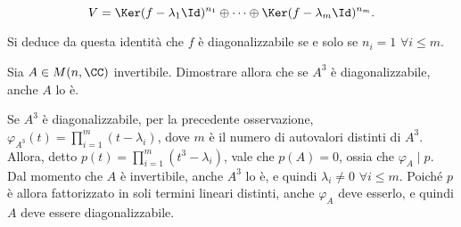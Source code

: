 \documentclass[11pt]{article}
\begin{document}
	\[ V = \Ker (f - \lambda_1 \Id)^{n_1} \oplus \cdots \oplus \Ker (f - \lambda_m \Id)^{n_m}. \]
	
	Si deduce da questa identità che $f$ è diagonalizzabile se e solo se $n_i = 1$ $\forall i \leq m$.
	
	\begin{exercise}
		Sia $A \in M(n, \CC)$ invertibile. Dimostrare allora che se $A^3$ è diagonalizzabile, anche $A$ lo è. 
	\end{exercise}

	\begin{solution}
		Se $A^3$ è diagonalizzabile, per la precedente osservazione, $\varphi_{A^3}(t) = \prod_{i=1}^m (t - \lambda_i)$,
		dove $m$ è il numero di autovalori distinti di $A^3$. Allora, detto $p(t) = \prod_{i=1}^m (t^3 - \lambda_i)$, vale che
		$p(A) = 0$, ossia che $\varphi_A \mid p$. Dal momento che $A$ è invertibile, anche $A^3$ lo è, e quindi
		$\lambda_i \neq 0$ $\forall i \leq m$. Poiché $p$ è allora fattorizzato in soli termini lineari distinti,
		anche $\varphi_A$ deve esserlo, e quindi $A$ deve essere diagonalizzabile.
	\end{solution}
\end{document}
